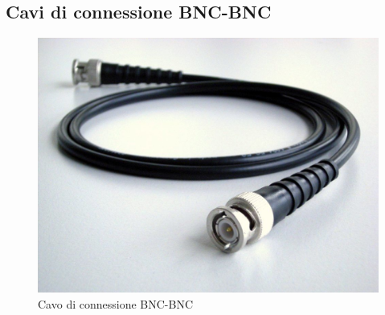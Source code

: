 \clearpage
\subsection*{\textbf{Cavi di connessione BNC-BNC}}
\begin{figure}[h]
    \centering
    \includegraphics[width=0.75\linewidth]{media/cavoBNC.png}
    \caption{Cavo di connessione BNC-BNC}
    \label{fig:enter-label}
\end{figure}
\FloatBarrier
\clearpage

